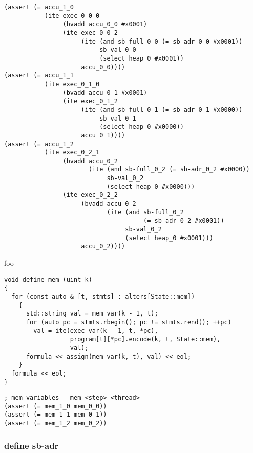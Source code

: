 \begin{lstlisting}[language=SMTLib]
(assert (= accu_1_0
           (ite exec_0_0_0
                (bvadd accu_0_0 #x0001)
                (ite exec_0_0_2
                     (ite (and sb-full_0_0 (= sb-adr_0_0 #x0001))
                          sb-val_0_0
                          (select heap_0 #x0001))
                     accu_0_0))))
(assert (= accu_1_1
           (ite exec_0_1_0
                (bvadd accu_0_1 #x0001)
                (ite exec_0_1_2
                     (ite (and sb-full_0_1 (= sb-adr_0_1 #x0000))
                          sb-val_0_1
                          (select heap_0 #x0000))
                     accu_0_1))))
(assert (= accu_1_2
           (ite exec_0_2_1
                (bvadd accu_0_2
                       (ite (and sb-full_0_2 (= sb-adr_0_2 #x0000))
                            sb-val_0_2
                            (select heap_0 #x0000)))
                (ite exec_0_2_2
                     (bvadd accu_0_2
                            (ite (and sb-full_0_2
                                      (= sb-adr_0_2 #x0001))
                                 sb-val_0_2
                                 (select heap_0 #x0001)))
                     accu_0_2))))
\end{lstlisting}


\noindent
foo

\begin{lstlisting}[style=c++]
void define_mem (uint k)
{
  for (const auto & [t, stmts] : alters[State::mem])
    {
      std::string val = mem_var(k - 1, t);
      for (auto pc = stmts.rbegin(); pc != stmts.rend(); ++pc)
        val = ite(exec_var(k - 1, t, *pc),
                  program[t][*pc].encode(k, t, State::mem),
                  val);
      formula << assign(mem_var(k, t), val) << eol;
    }
  formula << eol;
}
\end{lstlisting}

\begin{lstlisting}[language=SMTLib]
; mem variables - mem_<step>_<thread>
(assert (= mem_1_0 mem_0_0))
(assert (= mem_1_1 mem_0_1))
(assert (= mem_1_2 mem_0_2))
\end{lstlisting}

\subsubsection{define sb-adr}

